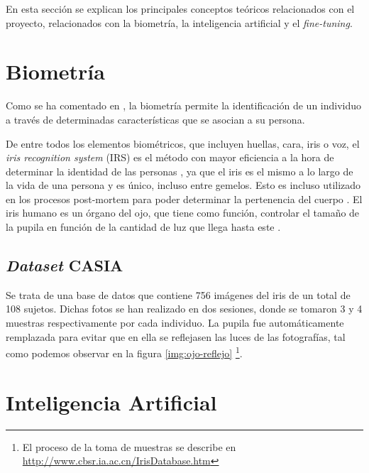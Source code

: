  \label{capitulo3}

En esta sección se explican los principales conceptos teóricos relacionados con el proyecto, relacionados con la biometría, la inteligencia
 artificial y el \textit{fine-tuning}.


\section{Biometría}

Como se ha comentado en , la biometría permite la identificación de un individuo a través de determinadas características que 
se asocian a su persona. 

De entre todos los elementos biométricos, que incluyen huellas, cara, iris o voz, el \textit{iris recognition system} (IRS) es el método con mayor eficiencia a la hora de determinar la identidad
de las personas \cite{malgheet_iris_2021}, ya que el iris es el mismo a lo largo de la vida de una persona y es único, incluso entre gemelos. Esto es incluso utilizado en los procesos 
post-mortem para poder determinar la pertenencia del cuerpo \cite{boyd_post-mortem_2020}. El iris humano es un órgano del ojo, que tiene como función, controlar el tamaño
de la pupila en función de la cantidad de luz que llega hasta este \cite{boyd_post-mortem_2020}.

\subsection{\textit{Dataset} CASIA}	

Se trata de una base de datos que contiene 756 imágenes del iris de un total de 108 sujetos. 
Dichas fotos se han realizado en dos sesiones, donde se tomaron 3 y 4 muestras respectivamente por cada individuo. 
La pupila fue automáticamente remplazada para evitar que en ella se reflejasen las luces de las fotografías, tal como podemos observar en la figura \ref{img:ojo-reflejo} 
\footnote{El proceso de la toma de muestras se describe en \url{http://www.cbsr.ia.ac.cn/IrisDatabase.htm}}.

 \label{img:ojo-reflejo}
\section{Inteligencia Artificial}

